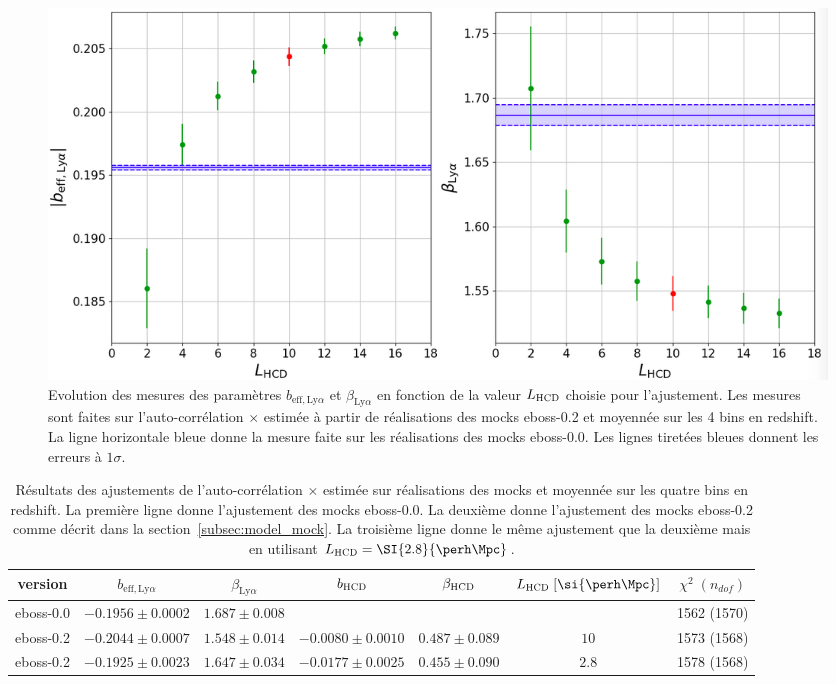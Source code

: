\begin{figure}
  \centering
  \includegraphics[scale=0.33]{bias_lya_vs_L0}
  \caption{Evolution des mesures des paramètres $b_{\mathrm{eff},\mathrm{Ly}\alpha}$ et $\beta_{\mathrm{Ly}\alpha}$ en fonction de la valeur $L_{\textsc{HCD}}$ choisie pour l'ajustement.
    Les mesures sont faites sur l'auto-corrélation \lya{}$\times$\lya{} estimée à partir de \Nmocks{} réalisations des mocks eboss-0.2 et moyennée sur les 4 bins en redshift. La ligne horizontale bleue donne la mesure faite sur les \Nmocks{} réalisations des mocks eboss-0.0. Les lignes tiretées bleues donnent les erreurs à $1 \sigma$.}
  \label{fig:bias_lya_vs_L0}
\end{figure}

\begin{table}[]
  \centering
  \caption{Résultats des ajustements de l'auto-corrélation \lya{}$\times$\lya{} estimée sur \Nmocks{} réalisations des mocks et moyennée sur les quatre bins en redshift. La première ligne donne l'ajustement des mocks eboss-0.0. La deuxième donne l'ajustement des mocks eboss-0.2 comme décrit dans la section~\ref{subsec:model_mock}. La troisième ligne donne le même ajustement que la deuxième mais en utilisant $L_{\textsc{HCD}} = \SI{2.8}{\perh\Mpc}$.}
  \label{tab:cf_eboss02_L028}
  \footnotesize
  \begin{tabular}{ccccccc}
    \toprule
    version & $b_{\mathrm{eff},\mathrm{Ly}\alpha}$ & $\beta_{\mathrm{Ly}\alpha}$ & $b_{\textsc{HCD}}$ & $\beta_{\textsc{HCD}}$ & $L_{\textsc{HCD}}\;[\si{\perh\Mpc}]$ & $\chi^2 \; (n_{dof})$ \\
    \midrule
    eboss-0.0 & $-0.1956 \pm 0.0002$ & $1.687 \pm 0.008$ & & & & 1562 (1570) \\
    eboss-0.2 & $-0.2044 \pm 0.0007$ & $1.548 \pm 0.014$ & $-0.0080 \pm 0.0010$ & $0.487 \pm 0.089$ & $10$ & 1573 (1568) \\
    eboss-0.2 & $-0.1925 \pm 0.0023$ & $ 1.647 \pm 0.034$ &  $-0.0177 \pm 0.0025$ & $ 0.455 \pm 0.090$ & $2.8$ & 1578 (1568) \\ 
    \bottomrule
  \end{tabular}
\end{table}

